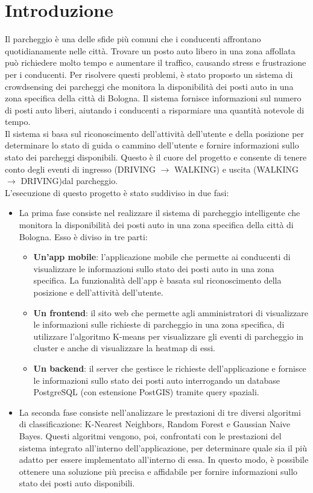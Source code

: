 \documentclass[../../Report.tex]{subfiles}
\begin{document}
    \chapter{Introduzione}
    Il parcheggio è una delle sfide più comuni che i conducenti affrontano quotidianamente nelle città. Trovare un posto auto libero in una zona affollata può richiedere molto tempo e aumentare il traffico, causando stress e frustrazione per i conducenti. Per risolvere questi problemi, è stato proposto un sistema di crowdsensing dei parcheggi che monitora la disponibilità dei posti auto in una zona specifica della città di Bologna. Il sistema fornisce informazioni sul numero di posti auto liberi, aiutando i conducenti a risparmiare una quantità notevole di tempo.\\
    Il sistema si basa sul riconoscimento dell'attività dell'utente e della posizione per determinare lo stato di guida o cammino dell'utente e fornire informazioni sullo stato dei parcheggi disponibili. Questo è il cuore del progetto e consente di tenere conto degli eventi di ingresso (DRIVING $\rightarrow$ WALKING) e uscita  (WALKING $\rightarrow$ DRIVING)dal parcheggio.\\
    L'esecuzione di questo progetto è stato suddiviso in due fasi:
    \begin{itemize}
        \item La prima fase consiste nel realizzare il sistema di parcheggio intelligente che monitora la disponibilità dei posti auto in una zona specifica della città di Bologna. Esso è diviso in tre parti:
        \begin{itemize}
            \item \textbf{Un'app mobile}: l'applicazione mobile che permette ai conducenti di visualizzare le informazioni sullo stato dei posti auto in una zona specifica. La funzionalità dell'app è basata sul riconoscimento della posizione e dell'attività dell'utente.
            \item \textbf{Un frontend}: il sito web che permette agli amministratori di visualizzare le informazioni sulle richieste di parcheggio in una zona specifica, di utilizzare l'algoritmo K-means per visualizzare gli eventi di parcheggio in cluster e anche di visualizzare la heatmap di essi.
            \item \textbf{Un backend}: il server che gestisce le richieste dell'applicazione e fornisce le informazioni sullo stato dei posti auto interrogando un database PostgreSQL (con estensione PostGIS) tramite query spaziali.
        \end{itemize}
        \item La seconda fase consiste nell'analizzare le prestazioni di tre diversi algoritmi di classificazione: K-Nearest Neighbors, Random Forest e Gaussian Naive Bayes. Questi algoritmi vengono, poi, confrontati con le prestazioni del sistema integrato all'interno dell'applicazione, per determinare quale sia il più adatto per essere implementato all'interno di essa. In questo modo, è possibile ottenere una soluzione più precisa e affidabile per fornire informazioni sullo stato dei posti auto disponibili. 
    \end{itemize}
\end{document}
